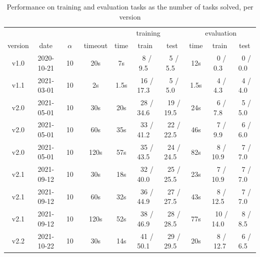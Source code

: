 \documentclass[a4paper]{llncs}
\begin{document}
\begin{table}[t]
  \centering
  \caption{Performance on training and evaluation tasks as the number of tasks solved, per version}
  \begin{tabular}{|c|c|c|c|c|c|c|c|c|c|}
    \hline
     & & & & \multicolumn{3}{c|}{training} & \multicolumn{3}{c|}{evaluation} \\
    version & date & $\alpha$ & timeout & time & train & test & time & train & test \\
    \hline
    v1.0 & 2020-10-21 & ~10~ & 20s & 7s & ~8 / 9.5~ & ~5 / 5.5~ & 12s & ~0 / 0.3~ & ~0 / 0.0~ \\
    \hline
    v1.1 & 2021-03-01 & ~10~ & 2s & 1.5s & ~16 / 17.3~ & ~5 / 5.0~ & 1.5s & ~4 / 4.3~ & ~4 / 4.0~ \\
    \hline
    v2.0 & 2021-05-01 & ~10~ & 30s & 20s & ~28 / 34.6~ & ~19 / 19.5~ & 24s & ~6 / 7.8~  & ~5 / 5.0~ \\
    v2.0 & 2021-05-01 & ~10~ & 60s & 35s & ~33 / 41.2~ & ~22 / 22.5~ & 46s & ~7 / 9.9~ & ~6 / 6.0~ \\
    v2.0 & 2021-05-01 & ~10~ & 120s & 57s & ~35 / 43.5~ & ~24 / 24.5~ & 82s & ~8 / 10.9~ & ~7 / 7.0~ \\
    \hline
    v2.1 & 2021-09-12 & ~10~ & 30s & 18s & ~32 / 40.0~ & ~25 / 25.5~ & 23s & ~7 / 10.9~ & ~7 / 7.0~ \\
    v2.1 & 2021-09-12 & ~10~ & 60s & 32s & ~36 / 44.9~ & ~27 / 27.5~ & 43s & ~8 / 12.5~ & ~7 / 7.0~ \\
    v2.1 & 2021-09-12 & ~10~ & 120s & 52s & ~38 / 46.9~ & ~28 / 28.5~ & 77s & ~10 / 14.0~ & ~8 / 8.5~ \\
    \hline
    v2.2 & 2021-10-22 & ~10~ & 30s & 14s & ~41 / 50.1~ & ~29 / 29.5~ & 20s & ~8 / 12.7 & ~6 / 6.5~ \\
    \hline
  \end{tabular}
  \label{tab:eval}
\end{table}
\end{document}
